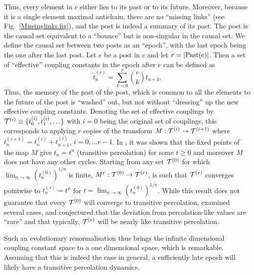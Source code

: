 Thus, every element in $c$ either lies to its past or to its
future. Moreover, because it is a single element maximal antichain, there are no ``missing links'' (see
Fig.~\ref{Missinglinks.fig}), and the post is indeed a
summary of its past. The post is  the causal set equivalent  to a ``bounce'' but is non-singular in the  causal set.  We
define the causal set between two posts as an ``epoch'',  with the
last epoch being the one after the last post. Let  $e$ be a post in $c$ and let  $r=|\mathrm{Past}(e)|$. Then a 
set of ``effective''  coupling constants in the epoch after $e$ can be defined as \citep{csgrg} 
\begin{equation}
\tilde t_n^{(r)}=\sum_{k=0}^r \binom{r}{k} t_{n+k}.
  \end{equation} 
Thus, the memory of the past of the post, which is common to all the elements to the future of the post is 
``washed'' out, but not without ``dressing'' up the new effective coupling constants. Denoting the set of effective couplings by $\mathcal T^{(i)}\equiv \{t_0^{(i)}, t_1^{(i)}, \ldots  \} $ with $i=0$ being the original set of couplings,  this    corresponds to applying
$r$ copies of  the transform $M: \mathcal T^{(i)} \rightarrow \mathcal T^{(i+1)}$ where $t_n^{(i+1)}=t_n^{(i)} + t_{n+1}^{(i)}$, $i=0,
\ldots r-1$. In \cite{csgrg}, it was shown that the fixed points of the map $M$  give $t_n=t^n$ (transitive percolation) for some $t \geq 0$ and
moreover  $M$ does not have any other cycles.  Starting from any set  $\mathcal T^{(0)}$ for which
$\lim_{n\rightarrow \infty} (t_n^{(0)})^{{1}/{n}}$ is finite, $M^r: \mathcal T^{(0)} \rightarrow \mathcal T^{(r)}$, is such that
$\mathcal T^{(r)}$ converges pointwise to $t^{(r)}_n=t^n$ for $t=\lim_{n\rightarrow \infty} (t_n^{(0)})^{{1}/{n}}$. While
this result does not guarantee that every $\mathcal T^{(0)}$ will converge to transitive percolation,
\cite{csgrg} examined several cases, and conjectured that the deviation from percolation-like values are ``rare'' and
that typically,  $\mathcal T^{(r)}$  will be nearly like transitive percolation.

Such an evolutionary renormalisation thus brings  the infinite dimensional coupling constant space to a one dimensional
space, which is remarkable. Assuming that this is indeed the case in general,  a sufficiently late epoch will likely
have a transitive
percolation dynamics.


